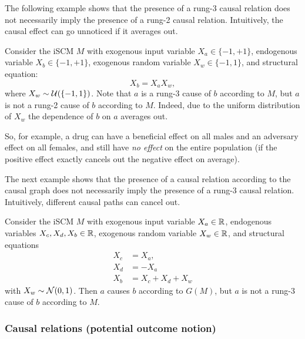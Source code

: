 The following example shows that the presence of a rung-3 causal relation does not necessarily imply the presence of a rung-2 causal relation.
Intuitively, the causal effect can go unnoticed if it averages out.
\begin{Eg}\label{eg:scm_cause_of_rung2_vs_rung3}
  Consider the iSCM $M$ with exogenous input variable $X_a \in \{-1,+1\}$, endogenous variable $X_b \in \{-1,+1\}$, exogenous random variable $X_w \in \{-1,1\}$, and structural equation:
  $$X_b = X_a X_w,$$
  where $X_w \sim \mathcal{U}(\{-1,1\})$.
  Note that $a$ is a rung-3 cause of $b$ according to $M$, but $a$ is not a rung-2 cause of $b$ according to $M$.
  Indeed, due to the uniform distribution of $X_w$ the dependence of $b$ on $a$ averages out.
\end{Eg}
So, for example, a drug can have a beneficial effect on all males and an adversary effect on all females, and still have \emph{no effect} on the entire population (if the positive effect exactly cancels out the negative effect on average).

The next example shows that the presence of a causal relation according to the causal graph does not necessarily imply the presence of a rung-3 causal relation.
Intuitively, different causal paths can cancel out.
\begin{Eg}\label{eg:scm_cause_of_graphical_vs_rung3}
  Consider the iSCM $M$ with exogenous input variable $X_a \in \mathbb{R}$, endogenous variables $X_c, X_d, X_b \in \mathbb{R}$, exogenous random variable $X_w \in \mathbb{R}$, and structural equations
  \begin{align*}
    X_c &= X_a, \\
    X_d &= -X_a \\
    X_b &= X_c + X_d + X_w 
  \end{align*}
  with $X_w \sim \mathcal{N}(0,1)$.
  Then $a$ causes $b$ according to $G(M)$, but $a$ is not a rung-3 cause of $b$ according to $M$.
\end{Eg}

\subsubsection{Causal relations (potential outcome notion)}

